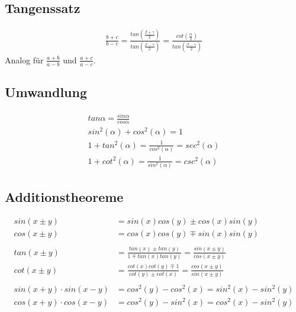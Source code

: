 	  \subsection{Tangenssatz}
	  \begin{align}
	    \frac{b + c}{b - c} = \frac{tan\left(\frac{\beta + \gamma}{2}\right)}{tan\left(\frac{\beta - \gamma}{2}\right)} 
	    = \frac{cot\left(\frac{\alpha}{2} \right)}{tan\left(\frac{\beta - \gamma}{2}\right)}
	  \end{align}
	  Analog für $\frac{a + b}{a - b}$ und $\frac{a + c}{a - c}$.\label{eq:trigo_tangenssatz}
	  
	  \subsection{Umwandlung}
	  \begin{align}
	    tan\alpha = \frac{sin\alpha}{cos\alpha}\\
	    sin^2(\alpha) + cos^2(\alpha) = 1\\
	    1 + tan^2(\alpha) = \frac{1}{cos^2(\alpha)} = sec^2(\alpha)\\
	    1 + cot^2(\alpha) = \frac{1}{sin^2(\alpha)} = csc^2(\alpha)\label{eq:trigo_umwandlung}
	  \end{align}
	  
	  \subsection{Additionstheoreme}
	  \begin{align}
	    sin(x \pm y) &= sin(x) cos(y) \pm cos(x) sin(y)\\
	    cos(x \pm y) &= cos(x) cos(y) \mp sin(x) sin(y)\\\\
	    tan(x \pm y) &= \frac{tan(x) \pm tan(y)}{1 \mp tan(x) tan(y)} = \frac{sin(x \pm y)}{cos(x \pm y)}\\
	    cot(x \pm y) &= \frac{cot(x) cot(y) \mp 1}{cot(y) \pm cot(x)} = \frac{cos(x \pm y)}{sin(x \pm y)}\\\\
	    sin(x + y) \cdot sin(x - y) &= cos^2(y) - cos^2(x) = sin^2(x) - sin^2(y)\\
	    cos(x + y) \cdot cos(x - y) &= cos^2(y) - sin^2(x) = cos^2(x) - sin^2(y)\label{eq:trigo_addtheo}
	  \end{align}
	  
